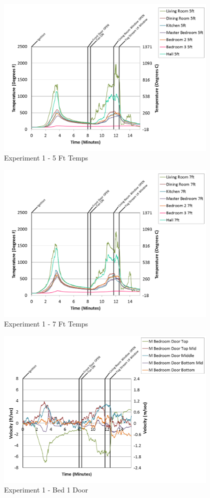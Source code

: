 \documentclass{article}
\begin{document}
\begin{appendices}
\clearpage

\begin{figure}[h!]
	\centering
	\includegraphics[height=3.05in]{0_Images/Results_Charts/Exp_1_Charts/5FtTemps.png}
	\caption{Experiment 1 - 5 Ft Temps}
\end{figure}


\begin{figure}[h!]
	\centering
	\includegraphics[height=3.05in]{0_Images/Results_Charts/Exp_1_Charts/7FtTemps.png}
	\caption{Experiment 1 - 7 Ft Temps}
\end{figure}

\clearpage

\begin{figure}[h!]
	\centering
	\includegraphics[height=3.05in]{0_Images/Results_Charts/Exp_1_Charts/Bed1Door.png}
	\caption{Experiment 1 - Bed 1 Door}
\end{figure}



\end{appendices}
\end{document}
